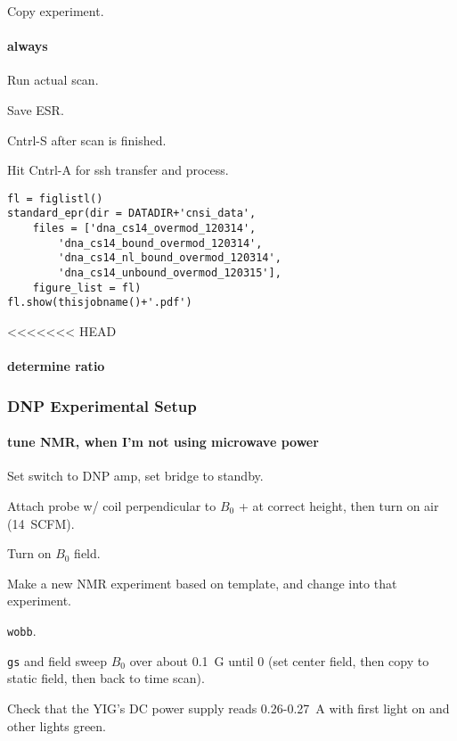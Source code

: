 Copy experiment.

\paragraph{always}
Run actual scan.

Save ESR.

Cntrl-S after scan is finished.

Hit Cntrl-A for ssh transfer and process.

\begin{tiny}
\begin{lstlisting}
fl = figlistl()
standard_epr(dir = DATADIR+'cnsi_data',
    files = ['dna_cs14_overmod_120314',
        'dna_cs14_bound_overmod_120314',
        'dna_cs14_nl_bound_overmod_120314',
        'dna_cs14_unbound_overmod_120315'],
    figure_list = fl)
fl.show(thisjobname()+'.pdf')
\end{lstlisting}
\end{tiny}

<<<<<<< HEAD
\paragraph{determine ratio}
\subsubsection{DNP Experimental Setup}

\paragraph{tune NMR, when I'm not using microwave power}
Set switch to DNP amp, set bridge to standby.

Attach probe w/ coil perpendicular to $B_0$ + at correct height, then turn on air (14~SCFM).

Turn on $B_0$ field.

Make a new NMR experiment based on template, and change into that experiment.

\texttt{wobb}. 

\texttt{gs} and field sweep $B_0$ over about 0.1~G until 0 (set center field, then copy to static field, then back to time scan).

Check that the YIG's DC power supply reads 0.26-0.27~A with first light on and other lights green.

